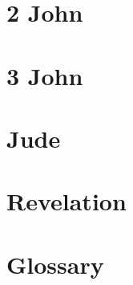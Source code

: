\chapter{2 John}
\begin{multicols}{2}
  \raggedcolumns
  \parskip=0pt \relax
  
\end{multicols}

\chapter{3 John}
\begin{multicols}{2}
  \raggedcolumns
  \parskip=0pt \relax
  
\end{multicols}

\chapter{Jude}
\begin{multicols}{2}
  \raggedcolumns
  \parskip=0pt \relax
  
\end{multicols}

\chapter{Revelation}
\begin{multicols}{2}
  \raggedcolumns
  \parskip=0pt \relax
  
\end{multicols}


\chapter{Glossary}


\newpage





















